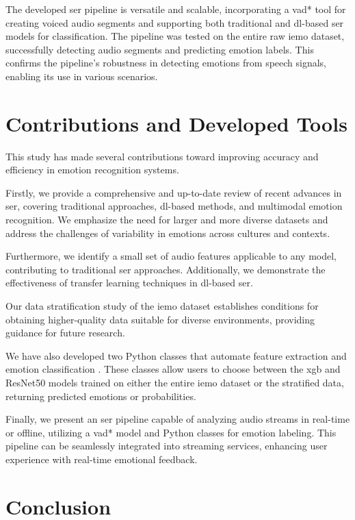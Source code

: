 The developed \ac{ser} pipeline is versatile and scalable, incorporating a \ac{vad*} tool for creating voiced audio segments and supporting both traditional and \ac{dl}-based \ac{ser} models for classification. The pipeline was tested on the entire raw \ac{iemo} dataset, successfully detecting audio segments and predicting emotion labels. This confirms the pipeline's robustness in detecting emotions from speech signals, enabling its use in various scenarios.

\section{Contributions and Developed Tools}

This study has made several contributions toward improving accuracy and efficiency in emotion recognition systems.

Firstly, we provide a comprehensive and up-to-date review of recent advances in \ac{ser}, covering traditional approaches, \ac{dl}-based methods, and multimodal emotion recognition. We emphasize the need for larger and more diverse datasets and address the challenges of variability in emotions across cultures and contexts.

Furthermore, we identify a small set of audio features applicable to any model, contributing to traditional \ac{ser} approaches. Additionally, we demonstrate the effectiveness of transfer learning techniques in \ac{dl}-based \ac{ser}.

Our data stratification study of the \ac{iemo} dataset establishes conditions for obtaining higher-quality data suitable for diverse environments, providing guidance for future research.

We have also developed two Python classes that automate feature extraction and emotion classification \cite{Mario_Silva_Speech_Emotion_Recognition_2023}. These classes allow users to choose between the \ac{xgb} and ResNet50 models trained on either the entire \ac{iemo} dataset or the stratified data, returning predicted emotions or probabilities.

Finally, we present an \ac{ser} pipeline capable of analyzing audio streams in real-time or offline, utilizing a \ac{vad*} model and Python classes for emotion labeling. This pipeline can be seamlessly integrated into streaming services, enhancing user experience with real-time emotional feedback.

\section{Conclusion}

